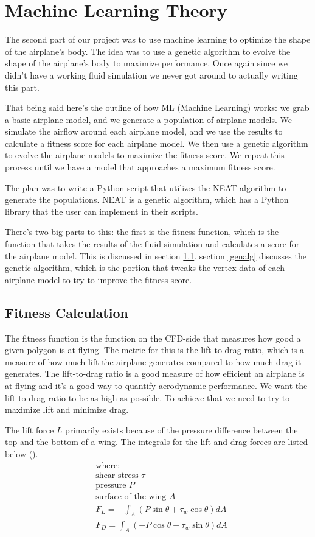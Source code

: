 \documentclass[a4paper,12pt,titlepage]{article}
\begin{document}
\section{Machine Learning Theory}
The second part of our project was to use machine learning to optimize the shape
of the airplane's body. The idea was to use a genetic algorithm to evolve the
shape of the airplane's body to maximize performance. Once again since we didn't
have a working fluid simulation we never got around to actually writing this part.

That being said here's the outline of how ML (Machine Learning) works: we grab
a basic airplane model, and we generate a population of airplane models. We
simulate the airflow around each airplane model, and we use the results to calculate
a fitness score for each airplane model. We then use a genetic algorithm to evolve
the airplane models to maximize the fitness score. We repeat this process until
we have a model that approaches a maximum fitness score.

The plan was to write a Python script that utilizes the NEAT algorithm to generate
the populations. NEAT is a genetic algorithm, which has a Python library that
the user can implement in their scripts.

There's two big parts to this: the first is the fitness function, which is the
function that takes the results of the fluid simulation and calculates a score
for the airplane model. This is discussed in section \ref{fitness}.
section \ref{genalg} discusses the genetic algorithm, which is the portion that tweaks
the vertex data of each airplane model to try to improve the fitness score.

\subsection{Fitness Calculation} \label{fitness}
The fitness function is the function on the CFD-side that measures how good a
given polygon is at flying. The metric for this is the lift-to-drag ratio, which
is a measure of how much lift the airplane generates compared to how much drag
it generates. The lift-to-drag ratio is a good measure of how efficient an airplane
is at flying and it's a good way to quantify aerodynamic performance. We want the
lift-to-drag ratio to be as high as possible. To achieve that we need to try
to maximize lift and minimize drag.

The lift force $L$ primarily exists because of the pressure difference between
the top and the bottom of a wing. The integrals for the lift and drag forces are
listed below (\cite{liftdrag}).
\[
	\begin{aligned}
		& \text{where:} \\
		& \text{shear stress } \tau \\
		& \text{pressure } P \\
		& \text{surface of the wing } A \\
		& F_L = -\int_A (P \sin \theta + \tau_w \cos \theta) dA \\
		& F_D = \int_A (-P \cos \theta + \tau_w \sin \theta) dA
	\end{aligned}
\]
\end{document}
